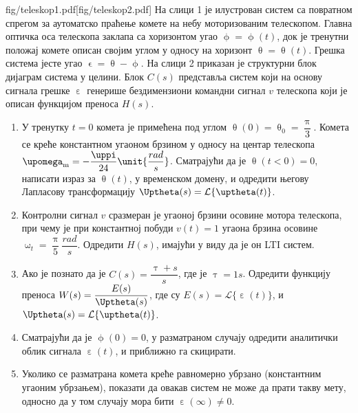 \mnDifficult
\begin{slikaDesno}{fig/teleskop1.pdf}[fig/teleskop2.pdf]
\PID
На слици 1 је илустрован систем са повратном спрегом
за аутоматско праћење комете на небу моторизованим телескопом.
Главна оптичка оса телескопа заклапа са 
хоризонтом угао 
$\upphi = \upphi(t)$, док је тренутни положај 
комете описан својим углом у односу на хоризонт 
$\uptheta = \uptheta(t)$. Грешка система јесте 
угао $\upvarepsilon = \uptheta-\upphi$. На слици 
2 приказан је структурни блок дијаграм система 
у целини. Блок $C(s)$ представља систем 
који на основу сигнала грешке $\upepsilon$ 
генерише бездимензиони командни сигнал $v$ телескопа који је описан функцијом 
преноса $H(s)$. 

\begin{enumerate}[label=(\alph*)]
\item У тренутку $t = 0$ комета је примећена
под углом $\uptheta(0) = \uptheta_0 = \dfrac{\uppi}{3}$.
Комета се креће константном угаоном брзином у 
односу на центар телескопа 
${\upomega_{\rm m} = -\dfrac{\uppi}{24} \unit{\dfrac{rad}{s}}}$. \vspace*{1mm} 
Сматрајући да је $\uptheta(t<0) = 0$, 
написати израз за $\uptheta(t)$, у временском домену,
и одредити његову Лапласову трансформацију 
$\Uptheta(s) = \mathcal{L}\{\uptheta(t)\}$.
\end{enumerate}
\end{slikaDesno}

\begin{enumerate}[label=(\alph*)] \setcounter{enumi}{1}
\item Контролни сигнал $v$ сразмеран је
угаоној брзини осовине мотора телескопа, при 
чему је при константној побуди 
$v(t) = 1$ угаона брзина осовине  
$\upomega_t = \dfrac{\uppi}{5} \unit{\dfrac{rad}{s}}$.
Одредити $H(s)$, имајући у 
виду да је он LTI 
систем.

\item Ако је познато да је 
$C(s) = \dfrac{\uptau + s}{s} $, где је 
$\uptau = 1\unit{s}$.\vspace*{1mm}
Одредити функцију преноса 
$W(s) = \dfrac{E(s)}{\Uptheta(s)}$, где су
$E(s) = \mathcal{L}\{\upepsilon(t)\}$, и
$\Uptheta(s) = \mathcal{L}\{\uptheta(t)\}$.


\item
Сматрајући да је $\upphi(0) = 0$, 
у разматраном случају одредити 
аналитички облик сигнала $\upepsilon(t)$, и
приближно га скицирати.
%
\item Уколико се разматрана комета креће 
равномерно убрзано (константним угаоним убрзањем), 
показати да овакав систем не може да прати такву мету,
односно да у том случају мора бити $\upepsilon(\infty) \neq 0$.
\end{enumerate}

